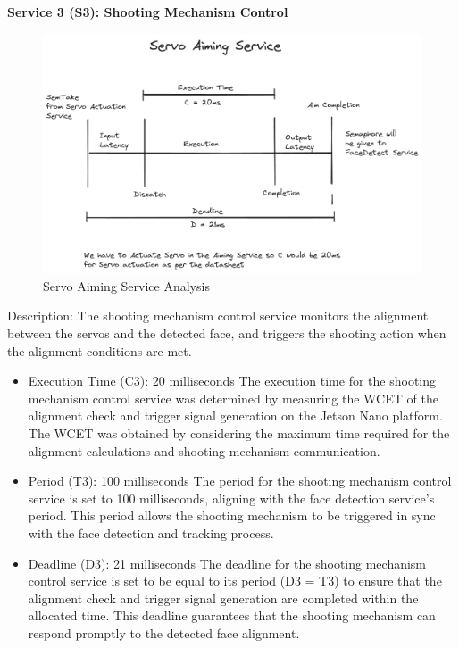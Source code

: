 \documentclass[a4paper,11pt]{article}%
\newenvironment{qanda}{\setlength{\parindent}{0pt}}{\bigskip}
\begin{document}
\begin{qanda}
\begin{enumerate}
			\textbf{Service 3 (S3): Shooting Mechanism Control}\\
			\begin{figure}[H]
				\centering
				\includegraphics[scale=0.4]{figures/servo_aiming_service.png}
				\caption{Servo Aiming Service Analysis}
			\end{figure}
			Description: The shooting mechanism control service monitors the alignment between the servos and the detected face, and triggers the shooting action when the alignment conditions are met.
			\begin{itemize}
				\item[] Execution Time (C3): 20 milliseconds
					The execution time for the shooting mechanism control service was determined by measuring the WCET of the alignment check and trigger signal generation on the Jetson Nano platform. The WCET was obtained by considering the maximum time required for the alignment calculations and shooting mechanism communication.
				\item[] Period (T3): 100 milliseconds
					The period for the shooting mechanism control service is set to 100 milliseconds, aligning with the face detection service's period. This period allows the shooting mechanism to be triggered in sync with the face detection and tracking process.
				\item[] Deadline (D3): 21 milliseconds
					The deadline for the shooting mechanism control service is set to be equal to its period (D3 = T3) to ensure that the alignment check and trigger signal generation are completed within the allocated time. This deadline guarantees that the shooting mechanism can respond promptly to the detected face alignment.
			\end{itemize}


\end{enumerate}
\end{qanda}
\end{document}
